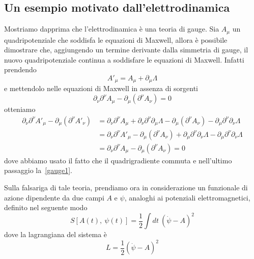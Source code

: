 \subsection{Un esempio motivato dall'elettrodinamica}

    Mostriamo dapprima che l'elettrodinamica è una teoria di gauge. Sia $A_\mu$ un quadripotenziale che soddisfa le equazioni di Maxwell, allora è possibile dimostrare che, aggiungendo un termine derivante dalla simmetria di gauge, il nuovo quadripotenziale continua a soddisfare le equazioni di Maxwell. Infatti prendendo 
    \begin{equation}\label{gaugeelettro}
        A'_\mu = A_\mu + \partial_\mu \Lambda
    \end{equation}
    e mettendolo nelle equazioni di Maxwell in assenza di sorgenti
    \begin{equation} \label{gauge1}
        \partial_\nu \partial^\nu A_\mu - \partial_\mu (\partial^\nu A_\nu) = 0
    \end{equation}
    otteniamo 
    \begin{equation*}
    \begin{aligned}
        \partial_\nu \partial^\nu A'_\mu - \partial_\mu (\partial^\nu A'_\nu) & = \partial_\nu \partial^\nu A_\mu + \partial_\nu \partial^\nu \partial_\mu \Lambda - \partial_\mu (\partial^\nu A_\nu) - \partial_\mu \partial^\nu \partial_\nu \Lambda \\ & = \partial_\nu \partial^\nu A'_\mu - \partial_\mu (\partial^\nu A_\nu) + \partial_\mu \partial^\nu \partial_\nu \Lambda - \partial_\mu \partial^\nu \partial_\nu \Lambda \\ & = \partial_\nu \partial^\nu A_\mu - \partial_\mu (\partial^\nu A_\nu) = 0
    \end{aligned}
    \end{equation*}
    dove abbiamo usato il fatto che il quadrigradiente commuta e nell'ultimo passaggio la~\eqref{gauge1}.

    \hfill

    Sulla falsariga di tale teoria, prendiamo ora in considerazione un funzionale di azione dipendente da due campi $A$ e $\psi$, analoghi ai potenziali elettromagnetici, definito nel seguente modo
    \begin{equation*}
        S[A(t),~\psi(t)] = \frac{1}{2} \int dt ~ {(\dot \psi - A)}^2
    \end{equation*}
    dove la lagrangiana del sistema è
    \begin{equation*}
        L = \frac{1}{2} {(\dot \psi - A)}^2
    \end{equation*}
    
